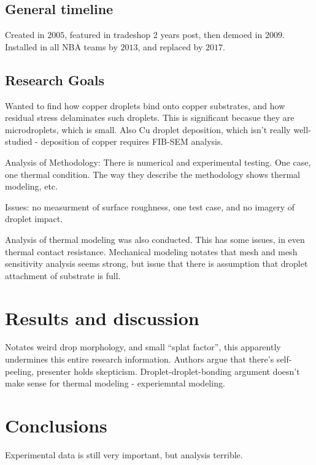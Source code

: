 \documentclass[10pt, oneside]{article}
\begin{document}
\subsection{General timeline}
Created in $2005$, featured in tradeshop 2 years post, then demoed in $2009$. Installed in all NBA teams by $2013$, and replaced by $2017$.

\subsection{Research Goals}
Wanted to find how copper droplets bind onto copper substrates, and how residual stress delaminates such droplets. This is significant becasue they are microdroplets, which is small. Also Cu droplet deposition, which isn't really well-studied - deposition of copper requires FIB-SEM analysis. 

Analysis of Methodology:
There is numerical and experimental testing. One case, one thermal condition. The way they describe the methodology shows thermal modeling, etc. 

Issues: no measurment of surface roughness, one test case, and no imagery of droplet impact. 

Analysis of thermal modeling was also conducted. This has some issues, in even thermal contact resistance. Mechanical modeling notates that mesh and mesh sensitivity analysis seems strong, but issue that there is assumption that droplet attachment of substrate is full. 

\section{Results and discussion}
Notates weird drop morphology, and small ``splat factor'', this apparently undermines this entire research information. Authors argue that there's self-peeling, presenter holds skepticism. Droplet-droplet-bonding argument doesn't make sense for thermal modeling - experiemntal modeling. 

\section{Conclusions}
Experimental data is still very important, but analysis terrible. 
\end{document}
